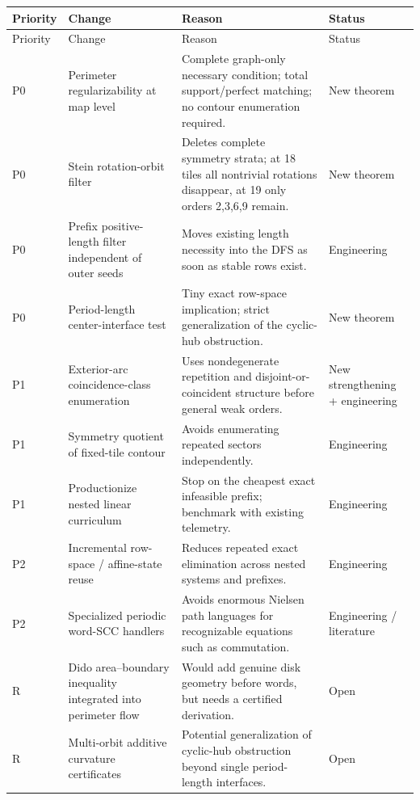 \documentclass[11pt]{article}
\theoremstyle{definition}
\theoremstyle{remark}
\begin{document}
\begin{longtable}{>{\raggedright\arraybackslash}p{} >{\raggedright\arraybackslash}p{} >{\raggedright\arraybackslash}p{} >{\raggedright\arraybackslash}p{}}
\toprule
Priority & Change & Reason & Status \\
\midrule
\endfirsthead
\toprule
Priority & Change & Reason & Status \\
\midrule
\endhead
P0 & Perimeter regularizability at map level & Complete graph-only necessary condition; total support/perfect matching; no contour enumeration required. & New theorem \\
P0 & Stein rotation-orbit filter & Deletes complete symmetry strata; at 18 tiles all nontrivial rotations disappear, at 19 only orders 2,3,6,9 remain. & New theorem \\
P0 & Prefix positive-length filter independent of outer seeds & Moves existing length necessity into the DFS as soon as stable rows exist. & Engineering \\
P0 & Period-length center-interface test & Tiny exact row-space implication; strict generalization of the cyclic-hub obstruction. & New theorem \\
P1 & Exterior-arc coincidence-class enumeration & Uses nondegenerate repetition and disjoint-or-coincident structure before general weak orders. & New strengthening + engineering \\
P1 & Symmetry quotient of fixed-tile contour & Avoids enumerating repeated sectors independently. & Engineering \\
P1 & Productionize nested linear curriculum & Stop on the cheapest exact infeasible prefix; benchmark with existing telemetry. & Engineering \\
P2 & Incremental row-space / affine-state reuse & Reduces repeated exact elimination across nested systems and prefixes. & Engineering \\
P2 & Specialized periodic word-SCC handlers & Avoids enormous Nielsen path languages for recognizable equations such as commutation. & Engineering / literature \\
R & Dido area--boundary inequality integrated into perimeter flow & Would add genuine disk geometry before words, but needs a certified derivation. & Open \\
R & Multi-orbit additive curvature certificates & Potential generalization of cyclic-hub obstruction beyond single period-length interfaces. & Open \\
\bottomrule
\end{longtable}
\end{document}
